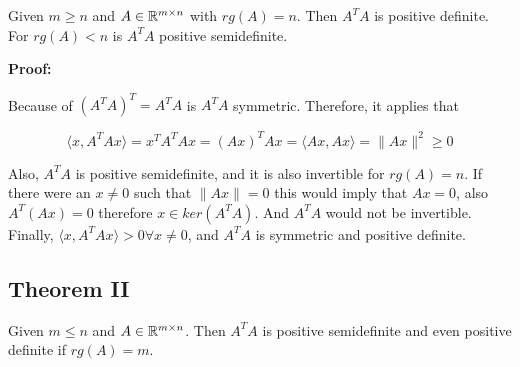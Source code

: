 Given \(m \ge n\) and \(A \in \mathbb{R}^{m \times n}\) with \(rg(A) = n\). Then \(A^T A\) is positive 
definite. For \(rg(A) < n\) is \(A^T A\) positive semidefinite.

\textbf{Proof:}

Because of \((A^T A)^T = A^T A\) is \(A^T A\) symmetric. Therefore, it applies that 

\[
    \langle x, A^T A x \rangle = x^T A^T A x  = (Ax)^T Ax = \langle Ax, Ax \rangle = \|Ax\|^2 \ge 0 
\]

Also, \(A^T A\) is positive semidefinite, and it is also invertible for \(rg(A) = n\). If there were an 
\(x \ne 0\) such that \(\|Ax\| = 0\) this would imply that \(Ax = 0\), also \(A^T (Ax) = 0\) therefore 
\(x \in ker(A^T A)\). And \(A^T A\) would not be invertible. Finally, 
\(\langle x, A^T Ax \rangle > 0 \forall x \ne 0\),  and \(A^T A\) is symmetric and positive definite.

\subsection{Theorem II}

Given \(m \le n\) and \(A \in \mathbb{R}^{m \times n}\). Then \(A^T A\) is positive semidefinite and even 
positive definite if \(rg(A) = m\).

